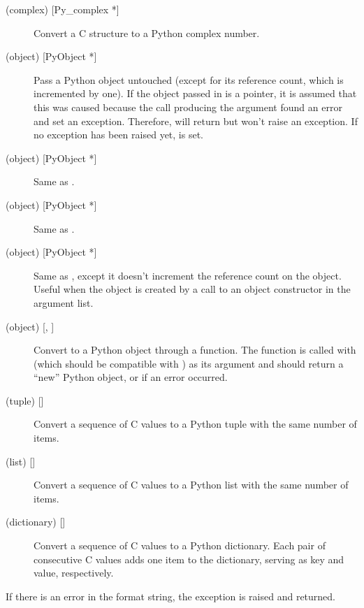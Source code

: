 \begin{description}
\item[ (complex) {[Py_complex *]}]
Convert a C  structure to a Python complex number.

\item[ (object) {[PyObject *]}]
Pass a Python object untouched (except for its reference count, which
is incremented by one).  If the object passed in is a \NULL{}
pointer, it is assumed that this was caused because the call producing
the argument found an error and set an exception.  Therefore,
 will return \NULL{} but won't raise an
exception.  If no exception has been raised yet,
 is set.

\item[ (object) {[PyObject *]}]
Same as .

\item[ (object) {[PyObject *]}]
Same as .

\item[ (object) {[PyObject *]}]
Same as , except it doesn't increment the reference count on
the object.  Useful when the object is created by a call to an object
constructor in the argument list.

\item[ (object) {[, ]}]
Convert  to a Python object through a 
function.  The function is called with  (which should be
compatible with ) as its argument and should return a
``new'' Python object, or \NULL{} if an error occurred.

\item[ (tuple) {[]}]
Convert a sequence of C values to a Python tuple with the same number
of items.

\item[ (list) {[]}]
Convert a sequence of C values to a Python list with the same number
of items.

\item[ (dictionary) {[]}]
Convert a sequence of C values to a Python dictionary.  Each pair of
consecutive C values adds one item to the dictionary, serving as key
and value, respectively.

\end{description}

If there is an error in the format string, the
 exception is raised and \NULL{} returned.

